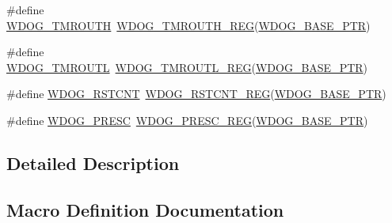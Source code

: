 \begin{DoxyCompactItemize}
\item 
\#define \hyperlink{group___w_d_o_g___register___accessor___macros_gab4868d043e2cfec8f98cfb8782bd60e6}{W\+D\+O\+G\+\_\+\+T\+M\+R\+O\+U\+TH}~\hyperlink{group___w_d_o_g___register___accessor___macros_ga6c5cca0fc2aeec6d1f8808f55c57acbb}{W\+D\+O\+G\+\_\+\+T\+M\+R\+O\+U\+T\+H\+\_\+\+R\+EG}(\hyperlink{group___w_d_o_g___peripheral_ga72fb27c7bc1ae124f180d8f2c7b9fa79}{W\+D\+O\+G\+\_\+\+B\+A\+S\+E\+\_\+\+P\+TR})
\item 
\#define \hyperlink{group___w_d_o_g___register___accessor___macros_ga37ac1b7e81db9a5b20a502c970d712c2}{W\+D\+O\+G\+\_\+\+T\+M\+R\+O\+U\+TL}~\hyperlink{group___w_d_o_g___register___accessor___macros_gaed1d5071ac9fb7f531fdda660780a329}{W\+D\+O\+G\+\_\+\+T\+M\+R\+O\+U\+T\+L\+\_\+\+R\+EG}(\hyperlink{group___w_d_o_g___peripheral_ga72fb27c7bc1ae124f180d8f2c7b9fa79}{W\+D\+O\+G\+\_\+\+B\+A\+S\+E\+\_\+\+P\+TR})
\item 
\#define \hyperlink{group___w_d_o_g___register___accessor___macros_gae3600ebbeca42091142fe17f7f2eab6a}{W\+D\+O\+G\+\_\+\+R\+S\+T\+C\+NT}~\hyperlink{group___w_d_o_g___register___accessor___macros_ga321d566d296ee323809e242077a1c776}{W\+D\+O\+G\+\_\+\+R\+S\+T\+C\+N\+T\+\_\+\+R\+EG}(\hyperlink{group___w_d_o_g___peripheral_ga72fb27c7bc1ae124f180d8f2c7b9fa79}{W\+D\+O\+G\+\_\+\+B\+A\+S\+E\+\_\+\+P\+TR})
\item 
\#define \hyperlink{group___w_d_o_g___register___accessor___macros_gac927e6dd73774cbbb57d36bbe3351925}{W\+D\+O\+G\+\_\+\+P\+R\+E\+SC}~\hyperlink{group___w_d_o_g___register___accessor___macros_gacbfa99926928928f05da2e4c752ea945}{W\+D\+O\+G\+\_\+\+P\+R\+E\+S\+C\+\_\+\+R\+EG}(\hyperlink{group___w_d_o_g___peripheral_ga72fb27c7bc1ae124f180d8f2c7b9fa79}{W\+D\+O\+G\+\_\+\+B\+A\+S\+E\+\_\+\+P\+TR})
\end{DoxyCompactItemize}


\subsection{Detailed Description}


\subsection{Macro Definition Documentation}
